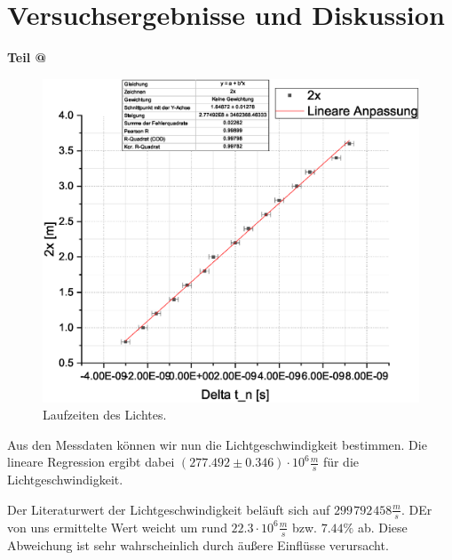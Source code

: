 \documentclass[10pt,a4paper]{article}
\makeatletter
\newcommand*{\rom}[1]{\expandafter\@slowromancap\romannumeral #1@}
\makeatother
\begin{document}
\section{Versuchsergebnisse und Diskussion}
\begin{flushleft}
\textbf{Teil \rom{1}}
\begin{figure}[H]
\centering
\includegraphics[scale=0.45]{Reflektor}
\caption{Laufzeiten des Lichtes.}
\label{fig:refl}
\end{figure}

Aus den Messdaten können wir nun die Lichtgeschwindigkeit bestimmen. Die lineare Regression ergibt dabei $(277.492 \pm 0.346) \cdot 10^6 \frac{m}{s}$ für die Lichtgeschwindigkeit.

Der Literaturwert der Lichtgeschwindigkeit beläuft sich auf $299\hspace{1pt}792\hspace{1pt}458 \frac{m}{s}$. DEr von uns ermittelte Wert weicht um rund $22.3 \cdot 10^6 \frac{m}{s}$ bzw. $7.44\%$ ab. Diese Abweichung ist sehr wahrscheinlich durch äußere Einflüsse verursacht.

\vspace{8pt}


\end{flushleft}
\end{document}
